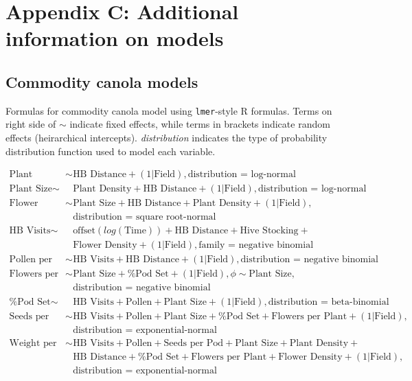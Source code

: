 \clearpage

\section*{Appendix C: Additional information on models}

\subsection*{Commodity canola models}

Formulas for commodity canola model using \texttt{lmer}-style R formulas. Terms on right side of $\sim$ indicate fixed effects, while terms in brackets indicate random effects (heirarchical intercepts). \textit{distribution} indicates the type of probability distribution function used to model each variable.

\begin{align*}
    \text{Plant Density} \sim & \text{HB Distance} + (1|\text{Field}), \text{distribution = log-normal} \\
    \text{Plant Size} \sim & \text{Plant Density} + \text{HB Distance} + (1|\text{Field}),\text{distribution = log-normal} \\
    \text{Flower Density} \sim & \text{Plant Size} + \text{HB Distance} + \text{Plant Density} + (1|\text{Field}),\\
    &   \text{distribution = square root-normal} \\
    \text{HB Visits} \sim & \text{offset}(log(\text{Time})) + \text{HB Distance} + \text{Hive Stocking} + \\ 
    &   \text{Flower Density} + (1|\text{Field}), \text{family = negative binomial}\\
    \text{Pollen per Stigma} \sim & \text{HB Visits} + \text{HB Distance} + (1|\text{Field}), \text{distribution = negative binomial} \\
    \text{Flowers per Plant} \sim & \text{Plant Size} + \text{\% Pod Set} + (1|\text{Field}), \phi \sim \text{Plant Size}, \\
    &     \text{distribution = negative binomial} \\
    \text{\% Pod Set} \sim & \text{HB Visits} + \text{Pollen} + \text{Plant Size} + (1|\text{Field}), \text{distribution = beta-binomial} \\
    \text{Seeds per Pod} \sim & \text{HB Visits} + \text{Pollen} + \text{Plant Size} + \text{\% Pod Set} + \text{Flowers per Plant} + (1|\text{Field}),\\ 
    &   \text{distribution = exponential-normal} \\
    \text{Weight per Seed} \sim & \text{HB Visits} + \text{Pollen} + \text{Seeds per Pod} + \text{Plant Size} + \text{Plant Density} +\\
    &   \text{HB Distance} + \text{\% Pod Set} + \text{Flowers per Plant} + \text{Flower Density} + (1|\text{Field}),\\
    &   \text{distribution = exponential-normal} \\
\end{align*}

